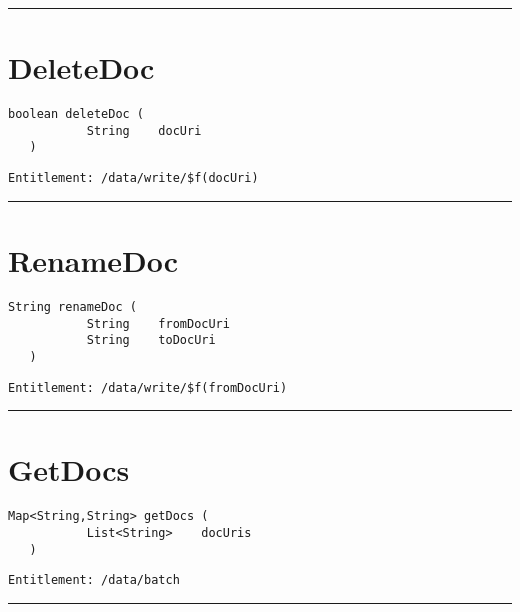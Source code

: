 \rule{12cm}{2pt}
\section{DeleteDoc}
\label{Api:DeleteDoc}
\begin{lstlisting}[style=nonumbers]
   boolean deleteDoc (
           String    docUri
   )
\end{lstlisting}
\begin{Verbatim}[formatcom=\color{Maroon}]
  Entitlement: /data/write/$f(docUri)
\end{Verbatim}



\rule{12cm}{2pt}
\section{RenameDoc}
\label{Api:RenameDoc}
\begin{lstlisting}[style=nonumbers]
   String renameDoc (
           String    fromDocUri
           String    toDocUri
   )
\end{lstlisting}
\begin{Verbatim}[formatcom=\color{Maroon}]
  Entitlement: /data/write/$f(fromDocUri)
\end{Verbatim}



\rule{12cm}{2pt}
\section{GetDocs}
\label{Api:GetDocs}
\begin{lstlisting}[style=nonumbers]
   Map<String,String> getDocs (
           List<String>    docUris
   )
\end{lstlisting}
\begin{Verbatim}[formatcom=\color{Maroon}]
  Entitlement: /data/batch
\end{Verbatim}



\rule{12cm}{2pt}
